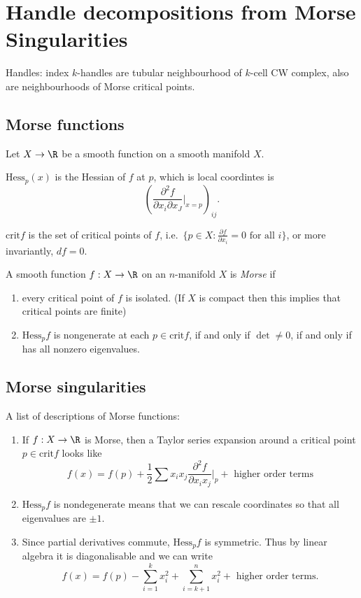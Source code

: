 \documentclass[a4paper]{article}
\begin{document}
\section{Handle decompositions from Morse Singularities}

Handles: index \(k\)-handles are tubular neighbourhood of \(k\)-cell CW complex, also are neighbourhoods of Morse critical points.

\subsection{Morse functions}

Let \(X \to \R\) be a smooth function on a smooth manifold \(X\).

\begin{definition}
  \(\textrm{Hess}_p(x)\) is the Hessian of \(f\) at \(p\), which is local coordintes is
  \[
    \left(
      \frac{\partial^2 f}{\partial x_i \partial x_J}|_{x = p}
    \right)_{ij}.
  \]

  \(\textrm{crit} f\) is the set of critical points of \(f\), i.e.\ \(\{p \in X: \frac{\partial f}{\partial x_i} = 0 \text{ for all } i\}\), or more invariantly, \(df = 0\).
\end{definition}

\begin{definition}
  A smooth function \(f: X \to \R\) on an \(n\)-manifold \(X\) is \emph{Morse} if
  \begin{enumerate}
  \item every critical point of \(f\) is isolated. (If \(X\) is compact then this implies that critical points are finite)
  \item \(\textrm{Hess}_p f\) is nongenerate at each \(p \in \textrm{crit} f\), if and only if \(\det \neq 0\), if and only if has all nonzero eigenvalues.
  \end{enumerate}
\end{definition}

\subsection{Morse singularities}

A list of descriptions of Morse functions:

\begin{enumerate}
\item If \(f: X \to \R\) is Morse, then a Taylor series expansion around a critical point \(p \in \textrm{crit} f\) looks like
  \[
    f(x) = f(p) + \frac{1}{2} \sum x_i x_j \frac{\partial^2 f}{\partial x_i x_j}\Bigg|_p + \text{ higher order terms}
  \]
\item \(\textrm{Hess}_p f\) is nondegenerate means that we can rescale coordinates so that all eigenvalues are \(\pm 1\).
\item Since partial derivatives commute, \(\textrm{Hess}_p f\) is symmetric. Thus by linear algebra it is diagonalisable and we can write
  \[
    f(x) = f(p) - \sum_{i = 1}^k x_i^2 + \sum_{i = k + 1}^n x_i^2 + \text{ higher order terms}.
  \]
\end{enumerate}
\end{document}
